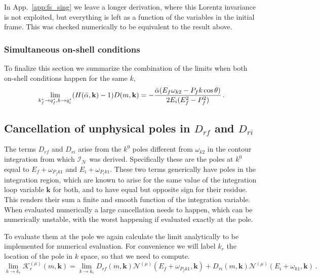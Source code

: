 \documentclass[aps,prd,onecolumn,groupedaddress]{revtex4-2}
\begin{document}
In App.~\ref{app:fs_sing} we leave a longer derivation, where this Lorentz invariance is not exploited, but everything is left as a function of the variables in the initial frame.
This was checked numerically to be equivalent to the result above.



\subsubsection{Simultaneous on-shell conditions}

To finalize this section we summarize the combination of the limits when both on-shell conditions happen for the same $k$,
\begin{equation}
    \lim_{k^{\star}_f\to q^\star_f,k\to q^\star_i}  (H(\bar{\alpha}, \textbf k) - 1)D(m,\mathbf k)
    = - \frac{\bar{\alpha}(E_f\omega_{k2}-P_fk\cos\theta)}{2E_i(E_f^2-P_f^2)}\,.
\end{equation}





\subsection{Cancellation of unphysical poles in \texorpdfstring{$D_{rf}$ and $D_{ri}$}{Drf and Dri}}

The terms $D_{rf}$ and $D_{ri}$ arise from the $k^0$ poles different from $\omega_{k2}$ in the contour integration from which $\mathcal I_{\mathcal N}$ was derived.
Specifically these are the poles at $k^0$ equal to $E_f+\omega_{P_fk1}$ and $E_i+\omega_{P_ik1}$.
These two terms generically have poles in the integration region, which are known to arise for the same value of the integration loop variable $\mathbf k$ for both, and to have equal but opposite sign for their residue.
This renders their sum a finite and smooth function of the integration variable.
When evaluated numerically a large cancellation needs to happen, which can be numerically unstable, with the worst happening if evaluated exactly at the pole.

To evaluate them at the pole we again calculate the limit analytically to be implemented for numerical evaluation.
For convenience we will label $k_r$ the location of the pole in $k$ space, so that we need to compute.
\begin{equation}
    \lim_{k\to k_r} \mathcal{K}^{(\mu)}_{r}(m, \mathbf k)
    = \lim_{k\to k_r}
 D_{rf} (m, \mathbf k)\mathcal{N}^{(\mu)}(E_f+\omega_{P_fk1},\mathbf k)
 +D_{ri}(m, \mathbf k)\mathcal{N}^{(\mu)}(E_i+\omega_{k1},\mathbf k)
    \,.\label{eq:Kr}
\end{equation}
\end{document}
